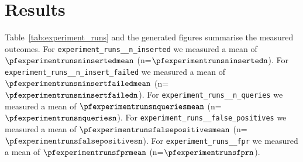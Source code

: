 \section{Results}
\label{sec:results}
Table~\ref{tab:experiment_runs} and the generated figures summarise the measured outcomes.
For \texttt{experiment\_runs\_\_n\_inserted} we measured a mean of $\pfexperimentrunsninsertedmean$ (n=$\pfexperimentrunsninsertedn$).
For \texttt{experiment\_runs\_\_n\_insert\_failed} we measured a mean of $\pfexperimentrunsninsertfailedmean$ (n=$\pfexperimentrunsninsertfailedn$).
For \texttt{experiment\_runs\_\_n\_queries} we measured a mean of $\pfexperimentrunsnqueriesmean$ (n=$\pfexperimentrunsnqueriesn$).
For \texttt{experiment\_runs\_\_false\_positives} we measured a mean of $\pfexperimentrunsfalsepositivesmean$ (n=$\pfexperimentrunsfalsepositivesn$).
For \texttt{experiment\_runs\_\_fpr} we measured a mean of $\pfexperimentrunsfprmean$ (n=$\pfexperimentrunsfprn$).

